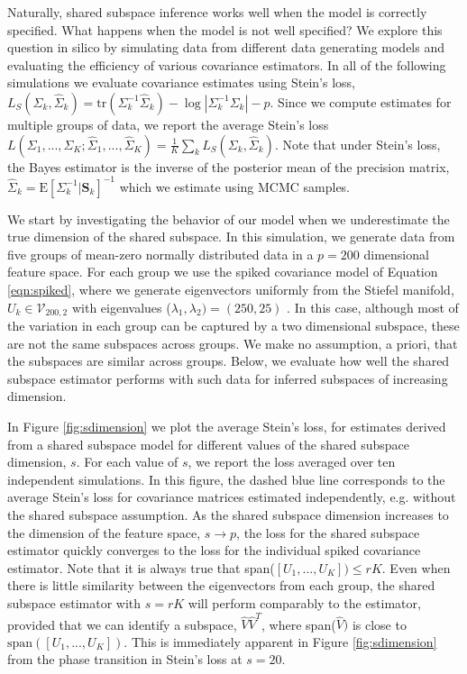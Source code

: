 \documentclass{article}
\newcommand{\bl}[1]{{\mathbf #1}}
\newcommand{\Exp}[1]{{\text{E}}[ \ensuremath{ #1 } ]  }
\begin{document}
Naturally, shared subspace inference works well when the model is
correctly specified.  What happens when the model is not well
specified?  We explore this question in silico by simulating data from
different data generating models and evaluating the efficiency of
various covariance estimators.  In all of the following simulations we
evaluate covariance estimates using Stein's loss,
$L_S( \Sigma_k , \hat\Sigma_k) = \text{tr}( \Sigma_k^{-1} \hat
\Sigma_k ) - \log |\Sigma_k^{-1} \Sigma_k | - p$.
Since we compute estimates for multiple groups of data, we report the
average Stein's loss
$L(\Sigma_1, ..., \Sigma_K; \hat\Sigma_1, ..., \hat\Sigma_K ) =
\frac{1}{K} \sum_k L_S( \Sigma_k , \hat\Sigma_k)$.
Note that under Stein's loss, the Bayes estimator is the inverse of
the posterior mean of the precision matrix,
$\hat \Sigma_{k} = \Exp{ \Sigma_k^{-1} | \bl S_k}^{-1}$ which we
estimate using MCMC samples.

We start by investigating the behavior of our model when we
underestimate the true dimension of the shared subspace.  In this
simulation, we generate data from five groups of mean-zero normally
distributed data in a $p=200$ dimensional feature space.  For each
group we use the spiked covariance model of Equation \ref{eqn:spiked},
where we generate eigenvectors uniformly from the Stiefel manifold,
$U_k \in \mathcal{V}_{200, 2}$ with eigenvalues
($\lambda_1, \lambda_2) = (250, 25)$ .  In this case, although most of
the variation in each group can be captured by a two dimensional
subspace, these are not the same subspaces across groups.  We make no
assumption, a priori, that the subspaces are similar across groups.
Below, we evaluate how well the shared subspace estimator performs with such
data for inferred subspaces of increasing dimension.

In Figure \ref{fig:sdimension} we plot the average Stein's loss, for
estimates derived from a shared subspace model for different values
of the shared subspace dimension, $s$.  For each value of $s$, we
report the loss averaged over ten independent simulations.  In this
figure, the dashed blue line corresponds to the average Stein's loss
for covariance matrices estimated independently, e.g. without the
shared subspace assumption.  As the shared subspace dimension increases to the
dimension of the feature space, $s \rightarrow p$, the loss for the
shared subspace estimator quickly converges to the loss for the
individual spiked covariance estimator.  Note that
it is always true that span($[U_1, ..., U_K]) \leq rK$.  Even when there is little
similarity between the eigenvectors from each group, the shared
subspace estimator with $s = rK$ will perform comparably to the
estimator, provided that we can identify a subspace, $\hat{V}\hat{V}^T$, where
span($\hat{V})$ is close to $\text{span}([U_1, ..., U_K])$.  This is
immediately apparent in Figure \ref{fig:sdimension} from the phase transition
in Stein's loss at $s = 20$.
\end{document}
